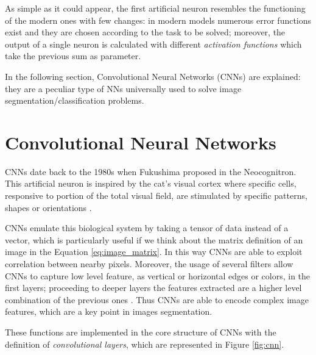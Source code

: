 \documentclass[../main.tex]{subfiles}
\begin{document}
As simple as it could appear, the first artificial neuron resembles the functioning of the modern ones with few changes: in modern models numerous  error functions exist and they are chosen according to the task to be solved; moreover, the output of a single neuron is calculated with different \textit{activation functions} which take the previous sum as parameter.

In the following section, Convolutional Neural Networks (CNNs) are explained: they are a peculiar type of NNs universally used to solve image segmentation/classification problems.


\section{Convolutional Neural Networks}

CNNs date back to the 1980s when Fukushima proposed in \cite{fukushima1982neocognitron} the Neocognitron. 
This artificial neuron is inspired by the cat's visual cortex where specific cells, responsive to portion of the total visual field, are stimulated by specific patterns, shapes or orientations \cite{hubel1959receptive-cats}. 

CNNs emulate this biological system by taking a tensor of data instead of a vector, which is particularly useful if we think about the matrix definition of an image in the Equation \ref{eq:image_matrix}.
In this way CNNs are able to exploit correlation between nearby pixels. 
Moreover, the usage of several filters allow CNNs to capture low level feature, as vertical or horizontal edges or colors, in the first layers; proceeding to deeper layers the features extracted are a higher level combination of the previous ones \cite{CNN_chapter13}.
Thus CNNs are able to encode complex image features, which are a key point in images segmentation.

These functions are implemented in the core structure of CNNs with the definition of \textit{convolutional layers}, which are represented in Figure \ref{fig:cnn}.
\end{document}
